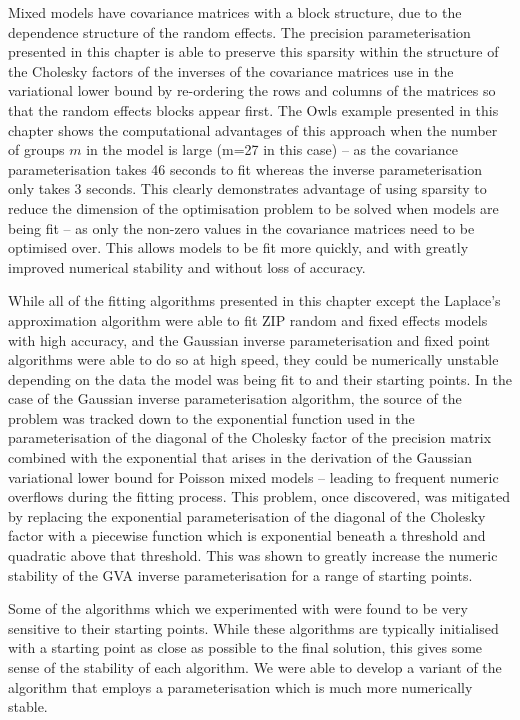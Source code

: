 Mixed models have covariance matrices with a block structure, due to the dependence structure of the
random effects. The precision parameterisation presented in this chapter is able to preserve this
sparsity within the structure of the Cholesky factors of the inverses of the covariance matrices use in
the variational lower bound by re-ordering the rows and columns of the matrices so that the random
effects blocks appear first. The Owls example presented in this chapter shows the computational
advantages of this approach when the number of groups $m$ in the model is large (m=27 in this case) --
as the covariance parameterisation takes 46 seconds to fit whereas the inverse parameterisation only
takes 3 seconds. This clearly demonstrates advantage of using sparsity to reduce the dimension of the
optimisation problem to be solved when models are being fit -- as only the non-zero values in the
covariance matrices need to be optimised over. This allows models to be fit more quickly, and with
greatly improved numerical stability and without loss of accuracy.

While all of the fitting algorithms presented in this chapter except the Laplace's approximation algorithm
were able to fit ZIP random and fixed effects models with high accuracy, and the  Gaussian inverse
parameterisation and fixed point algorithms were able to do so at high speed, they  could be numerically
unstable depending on the data the model was being fit to and their starting points. In the case of the
Gaussian inverse parameterisation algorithm, the source of the problem was tracked down to the exponential
function used in the parameterisation of the diagonal of the Cholesky factor of the precision matrix combined
with the exponential that arises in the derivation of the Gaussian variational lower bound for Poisson mixed
models -- leading to frequent numeric overflows during the fitting process. This problem, once discovered, was
mitigated by replacing the exponential parameterisation of the diagonal of the Cholesky factor with a
piecewise function which is exponential beneath a threshold and quadratic above that threshold. This was shown
to greatly increase the numeric stability of the GVA inverse parameterisation for a range of starting points.

Some of the algorithms which we experimented with were found to be very sensitive to their starting points.
While these algorithms are typically initialised with a starting point as close as possible to the final
solution, this gives some sense of the stability of each algorithm. We were able to develop a variant of the
algorithm that employs a parameterisation which is much more numerically stable.

